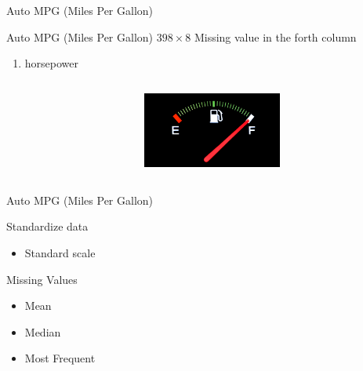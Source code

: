 \begin{frame}{Auto MPG (Miles Per Gallon)}


\bi
\mi Auto MPG (Miles Per Gallon)
\mi $398\times8$
\mi Missing value in the forth column
\begin{enumerate}
    \item horsepower 
  \end{enumerate}
\ei
\begin{columns}[t] %
     \begin{column}[T]{7cm} %
     
     \end{column}
     \begin{column}[T]{5cm} %
          \includegraphics[height=2.5cm]{fig/FuelGauge.jpg}
     \end{column}
 \end{columns}

\end{frame}

\begin{frame}{Auto MPG (Miles Per Gallon)}

\begin{tcolorbox}[colback=LightSteelBlue!5,colframe=yellow!40!black,title=Preprocessing]

\bi
\mi Standardize data
\begin{itemize}
    \item Standard scale
  \end{itemize}

  \mi Missing Values
\begin{itemize}
    \item Mean
    \item Median
    \item Most Frequent
  \end{itemize}
\ei


\end{tcolorbox}
\end{frame}

